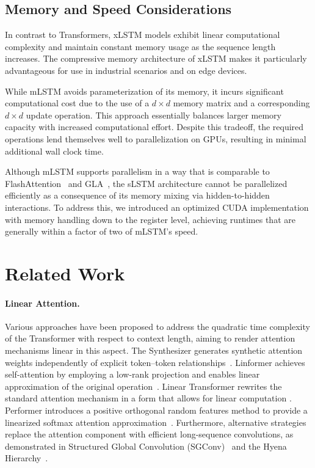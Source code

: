 \subsection{Memory and Speed Considerations}

In contrast to Transformers, xLSTM models exhibit linear computational complexity and maintain constant memory usage as the sequence length increases. The compressive memory architecture of xLSTM makes it particularly advantageous for use in industrial scenarios and on edge devices.

While mLSTM avoids parameterization of its memory, it incurs significant computational cost due to the use of a $d \times d$ memory matrix and a corresponding $d \times d$ update operation. This approach essentially balances larger memory capacity with increased computational effort. Despite this tradeoff, the required operations lend themselves well to parallelization on GPUs, resulting in minimal additional wall clock time.

Although mLSTM supports parallelism in a way that is comparable to FlashAttention~\citep{Dao:22,Dao:23} and GLA~\citep{Yang:23arxiv}, the sLSTM architecture cannot be parallelized efficiently as a consequence of its memory mixing via hidden-to-hidden interactions. To address this, we introduced an optimized CUDA implementation with memory handling down to the register level, achieving runtimes that are generally within a factor of two of mLSTM’s speed.

\section{Related Work}
\label{sec:related}

\paragraph{Linear Attention.} Various approaches have been proposed to address the quadratic time complexity of the Transformer with respect to context length, aiming to render attention mechanisms linear in this aspect. The Synthesizer generates synthetic attention weights independently of explicit token--token relationships~\citep{Tay:20arxiv}. Linformer achieves self-attention by employing a low-rank projection and enables linear approximation of the original operation~\citep{Wang:20arxiv}. Linear Transformer rewrites the standard attention mechanism in a form that allows for linear computation \citep{Katharopoulos:20}. Performer introduces a positive orthogonal random features method to provide a linearized softmax attention approximation~\citep{Choromanski:21}. Furthermore, alternative strategies replace the attention component with efficient long-sequence convolutions, as demonstrated in Structured Global Convolution (SGConv)~\citep{Li:22} and the Hyena Hierarchy~\citep{Poli:23}.

